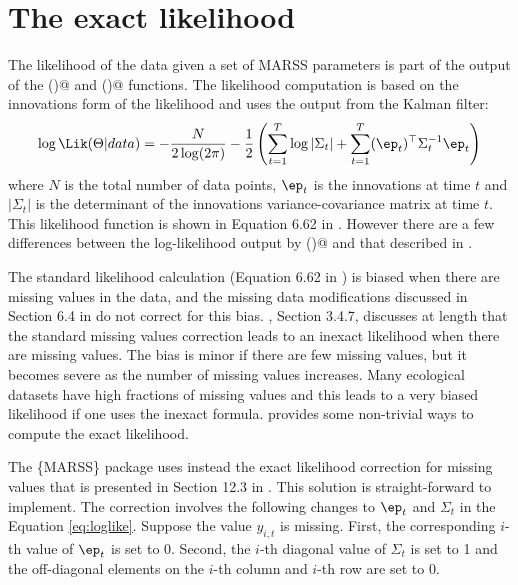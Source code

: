 \section{The exact likelihood}
\label{sec:exactlikelihood}
The likelihood of the data given a set of MARSS parameters is part of the output of the \verb@MARSSkfss()@ and \verb@MARSSkfas()@
 functions.  The likelihood computation is based on the innovations form of the likelihood \citep{Schweppe1965} and uses the output from the Kalman filter:
\begin{equation}
\log \Lik(\Theta | data) = -\frac{N}{2\log(2\pi)} - \frac{1}{2}\left( \sum_{t=1}^T\log |\Sigma_t| + \sum_{t=1}^T (\ep_t)^\top \Sigma_t^{-1} \ep_t \right)
\label{eq:loglike}
\end{equation}
where $N$ is the total number of data points, $\ep_t$ is the innovations at time $t$ and $|\Sigma_t|$ is the determinant of the innovations variance-covariance matrix at time $t$.  This likelihood function is shown in Equation 6.62 in \citet{ShumwayStoffer2006}. However there are a few differences between the log-likelihood output by \verb@MARSSkf()@ and that described in \citet{ShumwayStoffer2006}.

The standard likelihood calculation (Equation 6.62 in \citet{ShumwayStoffer2006}) is biased when there are missing values in the data, and the missing data modifications discussed in Section 6.4 in \citet{ShumwayStoffer2006} do not correct for this bias. \citet{Harvey1989}, Section 3.4.7, discusses at length that the standard missing values correction leads to an inexact likelihood when there are missing values. The bias is minor if there are few missing values, but it becomes severe as the number of missing values increases.  Many ecological datasets have high fractions of missing values and this  leads to a very biased likelihood if one uses the inexact formula.  \citet{Harvey1989} provides some non-trivial ways to compute the exact likelihood.  

The \{MARSS\} package uses instead the exact likelihood correction for missing values that is presented in Section 12.3 in \citet{BrockwellDavis1991}.  This solution is straight-forward to implement.  The correction involves the following changes to $\ep_t$ and $\Sigma_t$ in the Equation \ref{eq:loglike}.  Suppose the value $y_{i,t}$ is missing.  First, the corresponding $i$-th value of $\ep_t$ is set to 0.  Second, the $i$-th diagonal value of $\Sigma_t$ is set to 1 and the off-diagonal elements on the $i$-th column and $i$-th row are set to 0. 

